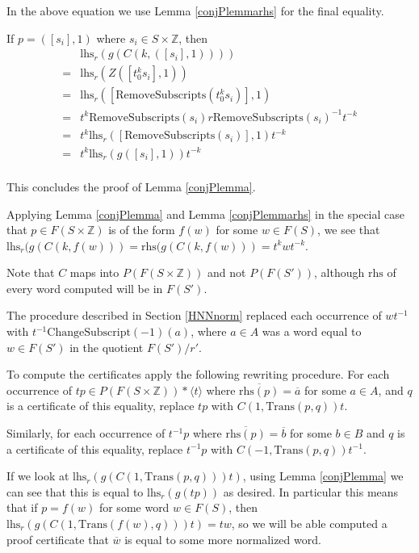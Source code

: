\documentclass[12pt]{article} %
\theoremstyle{definition}
\theoremstyle{definition}
\theoremstyle{definition}
\theoremstyle{definition}
\theoremstyle{definition}
\theoremstyle{definition}
\begin{document}
In the above equation we use Lemma \ref{conjPlemmarhs} for the final equality.

If $p = ([s_i], 1)$ where $s_i \in S \times \mathbb{Z}$, then
\begin{equation}
  \begin{aligned}
    & \text{lhs}_{r}(g(C(k, ([s_i], 1)))) \\
  = & \text{lhs}_r(Z([t_0^ks_i], 1)) \\
  = & \text{lhs}_r([\text{RemoveSubscripts}(t_0^ks_i)], 1) \\
  = & t^k \text{RemoveSubscripts}(s_i)r\text{RemoveSubscripts}(s_i)^{-1} t^{-k} \\
  = & t^k \text{lhs}_r([\text{RemoveSubscripts}(s_i)], 1) t^{-k} \\
  = & t^k \text{lhs}_r(g([s_i],1)) t^{-k} \\
  \end{aligned}
\end{equation}

This concludes the proof of Lemma \ref{conjPlemma}.

Applying Lemma \ref{conjPlemma} and Lemma \ref{conjPlemmarhs} in the special
case that $p \in F(S \times \mathbb{Z})$ is of the form $f(w)$ for some $w \in F(S)$,
we see that $\text{lhs}_r(g(C(k, f(w))) = \text{rhs}(g(C(k, f(w))) = t^k w t^{-k}$.

Note that $C$ maps into $P(F(S \times \mathbb{Z}))$
and not $P(F(S'))$, although $\text{rhs}$ of every word computed
will be in $F(S')$.

The procedure described in Section \ref{HNNnorm}
replaced each occurrence of $wt^{-1}$ with \newline $t^{-1}\text{ChangeSubscript}(-1)(a)$,
where $a \in A$ was a word equal to $w \in F(S')$ in the quotient $F(S') / r'$.

To compute the certificates apply the following rewriting procedure.
For each occurrence of
$tp \in P(F(S \times \mathbb{Z})) \ast \langle t \rangle$
where $\overline{\text{rhs}(p)} = \overline{a}$ for
some $a \in A$, and $q$ is a certificate of this equality,
replace $tp$ with $C(1, \text{Trans}(p, q))t$.

Similarly, for each occurrence of $t^{-1}p$ where $\overline{\text{rhs}(p)} = \overline{b}$ for
some $b \in B$ and $q$ is a certificate of this equality,
replace $t^{-1}p$ with $C(-1, \text{Trans}(p, q))t^{-1}$.

If we look at $\text{lhs}_r(g(C(1, \text{Trans}(p, q)))t)$, using Lemma
\ref{conjPlemma} we can see that this is equal to $\text{lhs}_r(g(tp))$ as desired.
In particular this means that if $p = f(w)$ for some word $w \in F(S)$, then
$\text{lhs}_r(g(C(1, \text{Trans}(f(w), q)))t) = tw$, so we will be able
computed a proof certificate that $\overline{w}$ is equal to some more normalized word.
\end{document}

